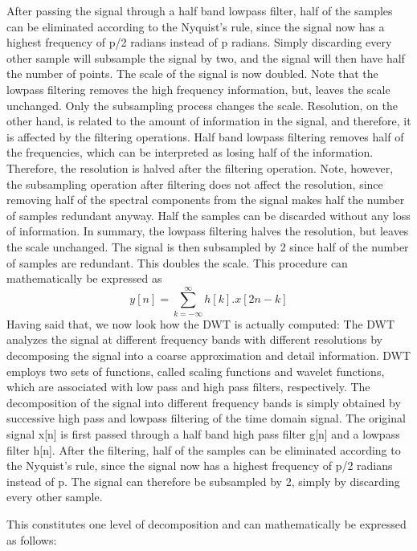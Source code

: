 \documentclass[12pt, a4paper, twoside]{report}
\begin{document}
\par
After passing the signal through a half band lowpass filter, half of the samples can be eliminated according to the Nyquist’s rule, since the signal now has a highest frequency of p/2 radians instead of p radians. Simply discarding every other sample will subsample the signal by two, and the signal will then have half the number of points. The scale of the signal is now doubled. Note that the lowpass filtering removes the high frequency information, but, leaves the scale unchanged. Only the subsampling process changes the scale. Resolution, on the other hand, is related to the amount of information in the signal, and therefore, it is affected by the filtering operations. Half band lowpass filtering removes half of the frequencies, which can be interpreted as losing half of the information. Therefore, the resolution is halved after the filtering operation. Note, however, the subsampling operation after filtering does not affect the resolution, since removing half of the spectral components from the signal makes half the number of samples redundant anyway. Half the samples can be discarded without any loss of information. In summary, the lowpass filtering halves the resolution, but leaves the scale unchanged. The signal is then subsampled by 2 since half of the number of samples are redundant. This doubles the scale. This procedure can mathematically be expressed as
\begin{equation*}
y[n] = \sum_{k=-\infty}^{\infty} h[k].x[2n-k]
\end{equation*}
Having said that, we now look how the DWT is actually computed: The DWT analyzes the signal at different frequency bands with different resolutions by decomposing the signal into a coarse approximation and detail information. DWT employs two sets of functions, called scaling functions and wavelet functions, which are associated with low pass and high pass filters, respectively. The decomposition of the signal into different frequency bands is simply obtained by successive high pass and lowpass filtering of the time domain signal. The original signal x[n] is first passed through a half band high pass filter g[n] and a lowpass filter h[n]. After the filtering, half of the samples can be eliminated according to the Nyquist’s rule, since the signal now has a highest frequency of p/2 radians instead of p. The signal can therefore be subsampled by 2, simply by discarding every other sample.
\par
This constitutes one level of decomposition and can mathematically be expressed as follows:
\end{document}
